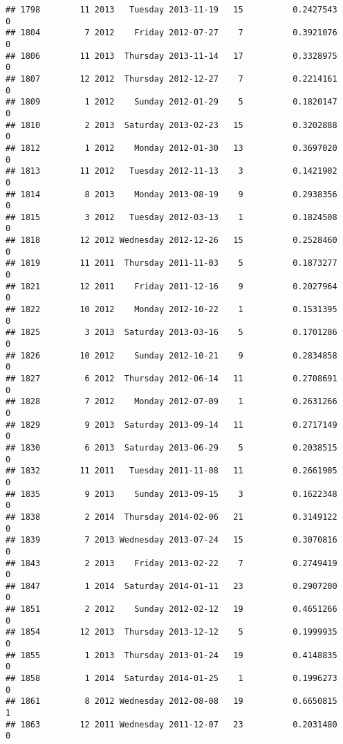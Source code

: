 \documentclass[
]{article}
\begin{document}
\begin{verbatim}
## 1798        11 2013   Tuesday 2013-11-19   15          0.2427543             0
## 1804         7 2012    Friday 2012-07-27    7          0.3921076             0
## 1806        11 2013  Thursday 2013-11-14   17          0.3328975             0
## 1807        12 2012  Thursday 2012-12-27    7          0.2214161             0
## 1809         1 2012    Sunday 2012-01-29    5          0.1820147             0
## 1810         2 2013  Saturday 2013-02-23   15          0.3202888             0
## 1812         1 2012    Monday 2012-01-30   13          0.3697020             0
## 1813        11 2012   Tuesday 2012-11-13    3          0.1421902             0
## 1814         8 2013    Monday 2013-08-19    9          0.2938356             0
## 1815         3 2012   Tuesday 2012-03-13    1          0.1824508             0
## 1818        12 2012 Wednesday 2012-12-26   15          0.2528460             0
## 1819        11 2011  Thursday 2011-11-03    5          0.1873277             0
## 1821        12 2011    Friday 2011-12-16    9          0.2027964             0
## 1822        10 2012    Monday 2012-10-22    1          0.1531395             0
## 1825         3 2013  Saturday 2013-03-16    5          0.1701286             0
## 1826        10 2012    Sunday 2012-10-21    9          0.2834858             0
## 1827         6 2012  Thursday 2012-06-14   11          0.2708691             0
## 1828         7 2012    Monday 2012-07-09    1          0.2631266             0
## 1829         9 2013  Saturday 2013-09-14   11          0.2717149             0
## 1830         6 2013  Saturday 2013-06-29    5          0.2038515             0
## 1832        11 2011   Tuesday 2011-11-08   11          0.2661905             0
## 1835         9 2013    Sunday 2013-09-15    3          0.1622348             0
## 1838         2 2014  Thursday 2014-02-06   21          0.3149122             0
## 1839         7 2013 Wednesday 2013-07-24   15          0.3070816             0
## 1843         2 2013    Friday 2013-02-22    7          0.2749419             0
## 1847         1 2014  Saturday 2014-01-11   23          0.2907200             0
## 1851         2 2012    Sunday 2012-02-12   19          0.4651266             0
## 1854        12 2013  Thursday 2013-12-12    5          0.1999935             0
## 1855         1 2013  Thursday 2013-01-24   19          0.4148835             0
## 1858         1 2014  Saturday 2014-01-25    1          0.1996273             0
## 1861         8 2012 Wednesday 2012-08-08   19          0.6650815             1
## 1863        12 2011 Wednesday 2011-12-07   23          0.2031480             0

\end{verbatim}
\end{document}
